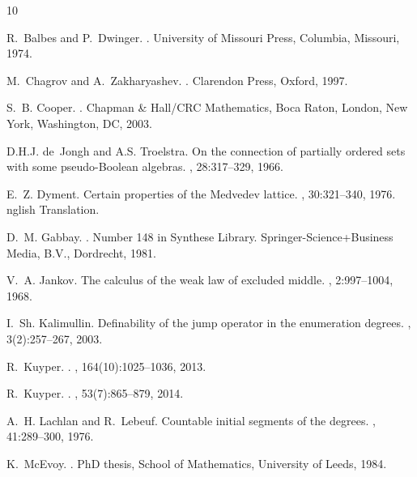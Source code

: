 \documentclass[11pt]{amsart}
\begin{document}
\begin{thebibliography}{10}

 R.~Balbes and P.~Dwinger. 
.
\newblock University of Missouri Press, Columbia, Missouri, 1974.

 M.~Chagrov and A.~Zakharyashev. 
.
\newblock Clarendon Press, Oxford, 1997.

 S.~B. Cooper. 
.
\newblock Chapman \& Hall/CRC Mathematics, Boca Raton, London, New York,
  Washington, DC, 2003.

 D.H.J. de~Jongh and A.S. Troelstra. 
\newblock On the connection of partially ordered sets with some
  pseudo-{B}oolean algebras.
, 28:317--329, 1966.

 E.~Z. Dyment. 
\newblock Certain properties of the {M}edvedev lattice.
, 30:321--340, 1976.
nglish {T}ranslation.

 D.~M. Gabbay. 
.
\newblock Number 148 in Synthese Library. Springer-Science+Business Media,
  B.V., Dordrecht, 1981.

 V.~A. Jankov. 
\newblock The calculus of the weak law of excluded middle.
, 2:997--1004, 1968.

 I.~Sh. Kalimullin. 
\newblock Definability of the jump operator in the enumeration degrees.
, 3(2):257--267, 2003.

 R.~Kuyper. 
.
, 164(10):1025--1036, 2013.

 R.~Kuyper. 
.
, 53(7):865--879, 2014.

 A.~H. Lachlan and R.~Lebeuf. 
\newblock Countable initial segments of the degrees.
, 41:289--300, 1976.

 K.~McEvoy. 
.
\newblock PhD thesis, School of Mathematics, University of Leeds, 1984.


\end{thebibliography}
\end{document}
